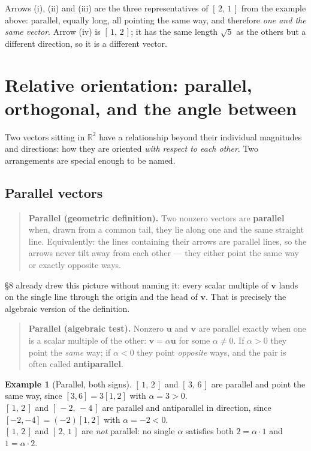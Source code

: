 \documentclass[11pt]{article}
\theoremstyle{definition}
\newtheorem{ex}{Example}
\theoremstyle{remark}
\newcommand{\R}{\mathbb{R}}
\newcommand{\vc}[1]{\mathbf{#1}}
\begin{document}
\noindent Arrows (i), (ii) and (iii) are the three representatives of
$[\,2,\,1\,]$ from the example above: parallel, equally long, all pointing the
same way, and therefore \emph{one and the same vector}. Arrow (iv) is
$[\,1,\,2\,]$; it has the same length $\sqrt5$ as the others but a different
direction, so it is a different vector.

\section{Relative orientation: parallel, orthogonal, and the angle between}
Two vectors sitting in $\R^{2}$ have a relationship beyond their individual
magnitudes and directions: how they are oriented \emph{with respect to each
other}. Two arrangements are special enough to be named.

\subsection{Parallel vectors}
\begin{quote}
\textbf{Parallel (geometric definition).} Two nonzero vectors are
\textbf{parallel} when, drawn from a common tail, they lie along one and the
same straight line. Equivalently: the lines containing their arrows are parallel
lines, so the arrows never tilt away from each other --- they either point the
same way or exactly opposite ways.
\end{quote}

\noindent \S8 already drew this picture without naming it: every scalar multiple
of $\vc{v}$ lands on the single line through the origin and the head of
$\vc{v}$. That is precisely the algebraic version of the definition.

\begin{quote}
\textbf{Parallel (algebraic test).} Nonzero $\vc{u}$ and $\vc{v}$ are parallel
exactly when one is a scalar multiple of the other: $\vc{v}=\alpha\vc{u}$ for
some $\alpha\neq0$. If $\alpha>0$ they point the \emph{same} way; if $\alpha<0$
they point \emph{opposite} ways, and the pair is often called
\textbf{antiparallel}.
\end{quote}

\begin{ex}[Parallel, both signs]
$[\,1,\,2\,]$ and $[\,3,\,6\,]$ are parallel and point the same way, since
$[3,6]=3[1,2]$ with $\alpha=3>0$. \\
$[\,1,\,2\,]$ and $[\,-2,\,-4\,]$ are parallel and antiparallel in direction,
since $[-2,-4]=(-2)[1,2]$ with $\alpha=-2<0$. \\
$[\,1,\,2\,]$ and $[\,2,\,1\,]$ are \emph{not} parallel: no single $\alpha$
satisfies both $2=\alpha\cdot1$ and $1=\alpha\cdot2$.
\end{ex}
\end{document}
